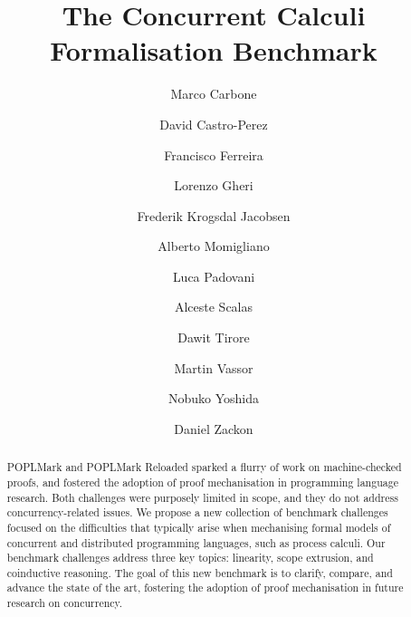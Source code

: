 \documentclass[runningheads]{llncs}
\begin{document}
\title{The Concurrent Calculi Formalisation Benchmark}

\author{
     Marco Carbone 
\and David Castro-Perez 
\and Francisco Ferreira 
\and Lorenzo Gheri 
\and Frederik Krogsdal Jacobsen 
\and Alberto Momigliano 
\and Luca Padovani 
\and Alceste Scalas 
\and Dawit Tirore 
\and Martin Vassor 
\and Nobuko Yoshida 
\and Daniel Zackon 
}



\maketitle

\begin{abstract}
  POPLMark and POPLMark Reloaded sparked a flurry of work on
  machine-checked proofs, and fostered the adoption of proof
  mechanisation in programming language research.  Both challenges
  were purposely limited in scope, and they do not address
  concurrency-related issues.  We propose a new collection of
  benchmark challenges focused on the difficulties that typically
  arise when mechanising formal models of concurrent and distributed
  programming languages, such as process calculi.  Our benchmark
  challenges address three key topics: linearity, scope extrusion, and
  coinductive reasoning.  The goal of this new benchmark is to
  clarify, compare, and advance the state of the art, fostering the
  adoption of proof mechanisation in future research on concurrency.

\end{abstract}
\end{document}
